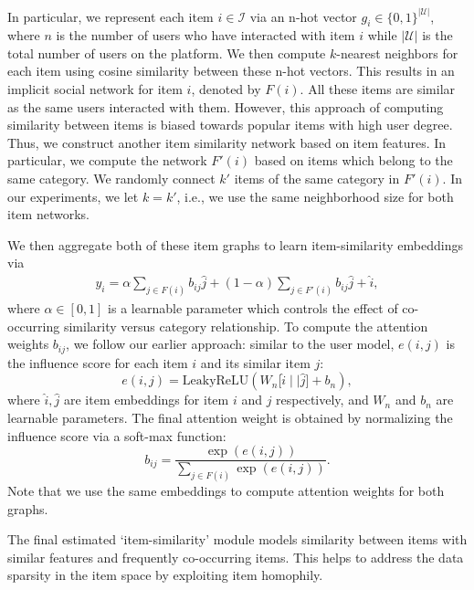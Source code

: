 In particular, we represent each item $i \in {\mathcal I}$ via an n-hot vector $g_i \in \{0,1\}^{\vert \mathcal{U} \vert}$, where $n$ is the number of users who have interacted with item $i$ while $\vert \mathcal{U} \vert$ is the total number of users on the platform.  We then compute $k$-nearest neighbors for each item using cosine similarity between these n-hot vectors. This results in an implicit social network for item $i$, denoted by $F(i)$. All these items are similar as the same users interacted with them.
However, this approach of computing similarity between items is biased towards popular items with high user degree. Thus, we construct another item similarity network based on item features. In particular, we compute the  network $F' (i)$ based on items which belong to the same category.
We randomly connect $k'$ items of the same category in $F'(i)$. In our experiments, we let $k = k' $, i.e., we use the same neighborhood size for both  item networks.

We then  aggregate both of these item  graphs to learn item-similarity embeddings via
\begin{align}
  \label{eq:item}
y_i = \alpha \sum_{j \in F(i)} b_{ij} \hat{j} + (1-\alpha)\sum_{j \in F'(i)} b_{ij} \hat{j} + \hat{i},
\end{align}
where $\alpha\in[0,1]$ is a learnable parameter which controls the effect of co-occurring similarity versus category relationship. To compute the attention weights $b_{ij}$, we follow our earlier approach:
similar to the user model, $e(i, j)$  is the influence score for each item $i$ and its similar item $j$:
\begin{equation}
  e(i,j) = \text{LeakyReLU}\left ( W_n\lbrack \hat{i} \mid \mid \hat{j} \rbrack + b_n \right),
  \end{equation}
where $\hat{i}, \hat{j}$ are item embeddings for item $i$ and $j$ respectively, and $W_n$ and $b_n$ are learnable parameters. The final attention weight is obtained by normalizing the influence score via a soft-max function:
\begin{equation}
  b_{ij} = \frac{\exp(e(i,j))} {\sum_{j \in F(i)} \exp(e(i,j))}.
  \end{equation}
Note that we use the same embeddings to compute attention weights for both graphs.

The final estimated `item-similarity' module models similarity between items with similar features and frequently co-occurring items. This helps to address the data sparsity in the item space by exploiting item homophily.


